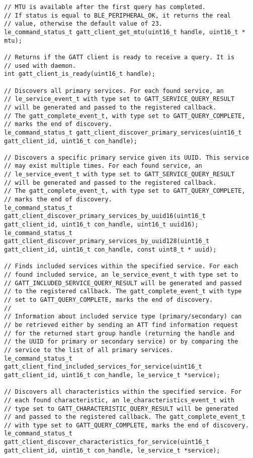 \begin{lstlisting}
// MTU is available after the first query has completed. 
// If status is equal to BLE_PERIPHERAL_OK, it returns the real 
// value, otherwise the default value of 23. 
le_command_status_t gatt_client_get_mtu(uint16_t handle, uint16_t * mtu);

// Returns if the GATT client is ready to receive a query. It is 
// used with daemon.
int gatt_client_is_ready(uint16_t handle);

// Discovers all primary services. For each found service, an
// le_service_event_t with type set to GATT_SERVICE_QUERY_RESULT
// will be generated and passed to the registered callback.
// The gatt_complete_event_t, with type set to GATT_QUERY_COMPLETE,
// marks the end of discovery.
le_command_status_t gatt_client_discover_primary_services(uint16_t gatt_client_id, uint16_t con_handle);

// Discovers a specific primary service given its UUID. This service
// may exist multiple times. For each found service, an
// le_service_event_t with type set to GATT_SERVICE_QUERY_RESULT
// will be generated and passed to the registered callback.
// The gatt_complete_event_t, with type set to GATT_QUERY_COMPLETE,
// marks the end of discovery.
le_command_status_t gatt_client_discover_primary_services_by_uuid16(uint16_t gatt_client_id, uint16_t con_handle, uint16_t uuid16);
le_command_status_t gatt_client_discover_primary_services_by_uuid128(uint16_t gatt_client_id, uint16_t con_handle, const uint8_t * uuid);

// Finds included services within the specified service. For each
// found included service, an le_service_event_t with type set to
// GATT_INCLUDED_SERVICE_QUERY_RESULT will be generated and passed
// to the registered callback. The gatt_complete_event_t with type
// set to GATT_QUERY_COMPLETE, marks the end of discovery.
//
// Information about included service type (primary/secondary) can
// be retrieved either by sending an ATT find information request
// for the returned start group handle (returning the handle and
// the UUID for primary or secondary service) or by comparing the
// service to the list of all primary services.
le_command_status_t gatt_client_find_included_services_for_service(uint16_t gatt_client_id, uint16_t con_handle, le_service_t *service);

// Discovers all characteristics within the specified service. For
// each found characteristic, an le_characteristics_event_t with 
// type set to GATT_CHARACTERISTIC_QUERY_RESULT will be generated 
// and passed to the registered callback. The gatt_complete_event_t 
// with type set to GATT_QUERY_COMPLETE, marks the end of discovery.
le_command_status_t gatt_client_discover_characteristics_for_service(uint16_t gatt_client_id, uint16_t con_handle, le_service_t *service);


\end{lstlisting}
